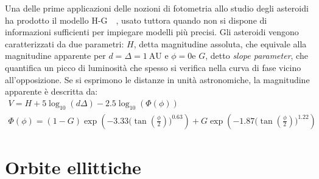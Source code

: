 \documentclass[12pt,a4paper,openright,twoside]{book}
\begin{document}
Una delle prime applicazioni delle nozioni di fotometria allo studio degli asteroidi ha prodotto il modello H-G~\cite{bowell1989}~\cite{dymock2007}, usato tuttora quando non si dispone di informazioni sufficienti per impiegare modelli più precisi. Gli asteroidi vengono caratterizzati da due parametri: $H$, detta magnitudine assoluta, che equivale alla magnitudine apparente per $d=\Delta=1~\mathrm{AU}$ e $\phi=0$\quad e $G$, detto \textit{slope parameter}, che quantifica un picco di luminosità che spesso si verifica nella curva di fase vicino all'opposizione. Se si esprimono le distanze in unità astronomiche, la magnitudine apparente è descritta da:
\begin{gather}
V=H+5\log_{10}(d\Delta)-2.5\log_{10}(\Phi(\phi)) \\
\Phi(\phi)=(1-G)\exp\left(-3.33\bigl(\tan\left(\tfrac{\phi}{2}\right)\bigr)^{0.63}\right)+G\exp\left(-1.87\bigl(\tan\left(\tfrac{\phi}{2}\right)\bigr)^{1.22}\right)
\end{gather}

\section{Orbite ellittiche}
\end{document}
